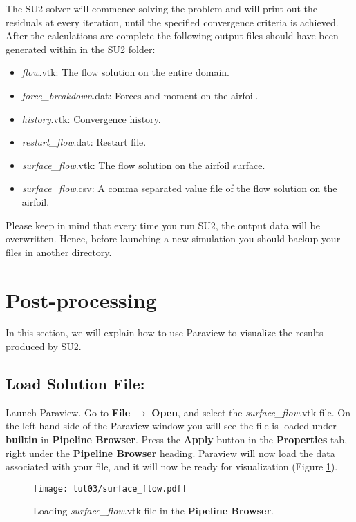 The SU2 solver will commence solving the problem and will print out the residuals at every iteration, until the specified convergence criteria is achieved. After the calculations are complete the following output files should have been generated within in the SU2 folder:
\begin{itemize}
    \item \textit{flow}.vtk: The flow solution on the entire domain.
    \item \textit{force\_breakdown}.dat: Forces and moment on the airfoil.
    \item \textit{history}.vtk: Convergence history.
    \item \textit{restart\_flow}.dat: Restart file.
    \item \textit{surface\_flow}.vtk: The flow solution on the airfoil surface.
    \item \textit{surface\_flow}.csv: A comma separated value file of the flow solution on the airfoil.
\end{itemize}
Please keep in mind that every time you run SU2, the output data will be overwritten. Hence, before launching a new simulation you should backup your files in another directory.
\section{Post-processing}
In this section, we will explain how to use Paraview to visualize the results produced by SU2. 
\subsection{Load Solution File:}
Launch Paraview. Go to \textbf{File} $\rightarrow$ \textbf{Open}, and select the \textit{surface\_flow}.vtk file. On the left-hand side of the Paraview window you will see the file is loaded under \textbf{builtin} in \textbf{Pipeline Browser}. Press the \textbf{Apply} button in the \textbf{Properties} tab, right under the \textbf{Pipeline Browser} heading. Paraview will now load the data associated with your file, and it will now be ready for visualization (Figure \ref{fig3:load}).
\begin{figure}[htbp]
    \centering
    \texttt{[image: tut03/surface\_flow.pdf]}
    \caption{Loading \textit{surface\_flow}.vtk file in the \textbf{Pipeline Browser}.}
    \label{fig3:load}
\end{figure}
